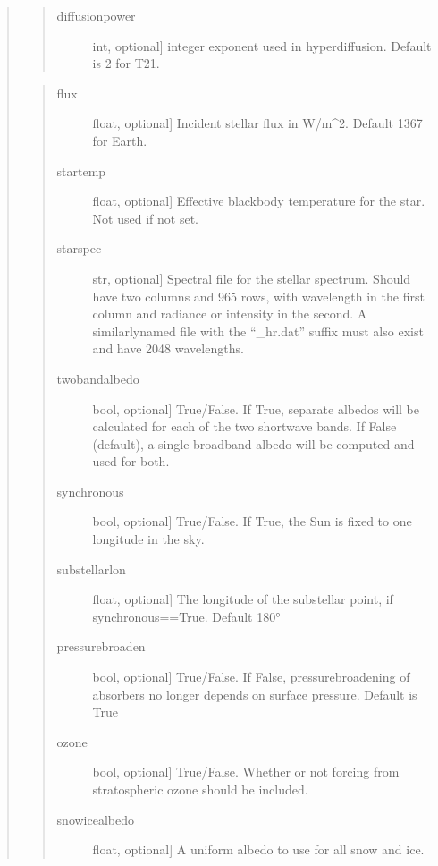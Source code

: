\documentclass[letterpaper,10pt,english]{sphinxmanual}
\begin{document}
\begin{fulllineitems}
\begin{fulllineitems}
\begin{quote}
\begin{quote}
\begin{description}
\item[{diffusionpower}] \leavevmode{[}int, optional{]}
integer exponent used in hyperdiffusion. Default is 2 for T21.

\end{description}
\end{quote}

\begin{quote}
\begin{description}
\item[{flux}] \leavevmode{[}float, optional{]}
Incident stellar flux in W/m\textasciicircum{}2. Default 1367 for Earth.

\item[{startemp}] \leavevmode{[}float, optional{]}
Effective blackbody temperature for the star. Not used if not set.

\item[{starspec}] \leavevmode{[}str, optional{]}
Spectral file for the stellar spectrum. Should have two columns and 965 rows,
with wavelength in the first column and radiance or intensity in the second.
A similarly\sphinxhyphen{}named file with the “\_hr.dat” suffix must also exist and have
2048 wavelengths.

\item[{twobandalbedo}] \leavevmode{[}bool, optional{]}
True/False. If True, separate albedos will be calculated for each of the
two shortwave bands. If False (default), a single broadband albedo will be
computed and used for both.

\item[{synchronous}] \leavevmode{[}bool, optional{]}
True/False. If True, the Sun is fixed to one longitude in the sky.

\item[{substellarlon}] \leavevmode{[}float, optional{]}
The longitude of the substellar point, if synchronous==True. Default 180°

\item[{pressurebroaden}] \leavevmode{[}bool, optional{]}
True/False. If False, pressure\sphinxhyphen{}broadening of absorbers no longer depends
on surface pressure. Default is True

\item[{ozone}] \leavevmode{[}bool, optional{]}
True/False. Whether or not forcing from stratospheric ozone should be included.

\item[{snowicealbedo}] \leavevmode{[}float, optional{]}
A uniform albedo to use for all snow and ice.


\end{description}
\end{quote}
\end{quote}
\end{fulllineitems}
\end{fulllineitems}
\end{document}
